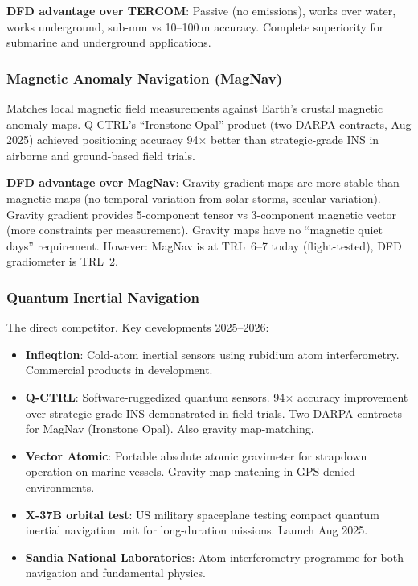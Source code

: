 \documentclass[11pt]{article}
\theoremstyle{definition}
\theoremstyle{remark}
\begin{document}
\textbf{DFD advantage over TERCOM}: Passive (no emissions), works over water,
works underground, sub-mm vs 10--100\,m accuracy. Complete superiority for
submarine and underground applications.

\subsubsection{Magnetic Anomaly Navigation (MagNav)}

Matches local magnetic field measurements against Earth's crustal magnetic
anomaly maps. Q-CTRL's ``Ironstone Opal'' product (two DARPA contracts, Aug 2025)
achieved positioning accuracy 94$\times$ better than strategic-grade INS in
airborne and ground-based field trials.

\textbf{DFD advantage over MagNav}: Gravity gradient maps are more stable than
magnetic maps (no temporal variation from solar storms, secular variation).
Gravity gradient provides 5-component tensor vs 3-component magnetic vector
(more constraints per measurement). Gravity maps have no ``magnetic quiet days''
requirement. However: MagNav is at TRL~6--7 today (flight-tested), DFD
gradiometer is TRL~2.

\subsubsection{Quantum Inertial Navigation}

The direct competitor. Key developments 2025--2026:
\begin{itemize}
  \item \textbf{Infleqtion}: Cold-atom inertial sensors using rubidium atom
    interferometry. Commercial products in development.
  \item \textbf{Q-CTRL}: Software-ruggedized quantum sensors. 94$\times$
    accuracy improvement over strategic-grade INS demonstrated in field trials.
    Two DARPA contracts for MagNav (Ironstone Opal). Also gravity map-matching.
  \item \textbf{Vector Atomic}: Portable absolute atomic gravimeter for
    strapdown operation on marine vessels. Gravity map-matching in GPS-denied
    environments.
  \item \textbf{X-37B orbital test}: US military spaceplane testing compact
    quantum inertial navigation unit for long-duration missions. Launch Aug 2025.
  \item \textbf{Sandia National Laboratories}: Atom interferometry programme
    for both navigation and fundamental physics.
\end{itemize}
\end{document}
